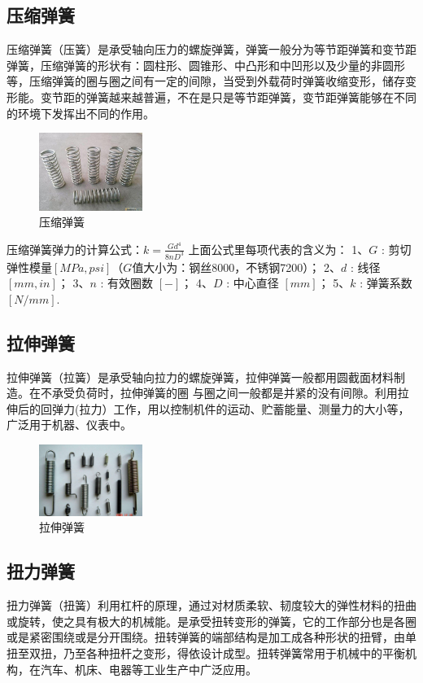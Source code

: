 \documentclass[UTF8]{article} %
\begin{document}
\subsection{压缩弹簧}
压缩弹簧（压簧）是承受轴向压力的螺旋弹簧，弹簧一般分为等节距弹簧和变节距弹簧，压缩弹簧的形状有：圆柱形、圆锥形、中凸形和中凹形以及少量的非圆形等，压缩弹簧的圈与圈之间有一定的间隙，当受到外载荷时弹簧收缩变形，储存变形能。变节距的弹簧越来越普遍，不在是只是等节距弹簧，变节距弹簧能够在不同的环境下发挥出不同的作用。

\begin{figure}[h]
  \centering
  \includegraphics[width=0.3\textwidth]{th2.png}
  \caption{压缩弹簧}
\end{figure}

压缩弹簧弹力的计算公式：$k=\frac{Gd^4}{8nD^3}$
上面公式里每项代表的含义为：
1、$G$ : 剪切弹性模量$[MPa, psi]$（$G$值大小为：钢丝8000，不锈钢7200）；
2、$d$ : 线径 $[mm, in]$；
3、$n$ : 有效圈数 $[-]$；
4、$D$ : 中心直径 $[mm]$；
5、$k$ : 弹簧系数 $[N/mm]$.



\subsection{拉伸弹簧}
拉伸弹簧（拉簧）是承受轴向拉力的螺旋弹簧，拉伸弹簧一般都用圆截面材料制造。在不承受负荷时，拉伸弹簧的圈 与圈之间一般都是并紧的没有间隙。利用拉伸后的回弹力(拉力）工作，用以控制机件的运动、贮蓄能量、测量力的大小等，广泛用于机器、仪表中。

\begin{figure}[h]
  \centering
  \includegraphics[width=0.3\textwidth]{tan3.png}
  \caption{拉伸弹簧}
\end{figure}

\subsection{扭力弹簧}
扭力弹簧（扭簧）利用杠杆的原理，通过对材质柔软、韧度较大的弹性材料的扭曲或旋转，使之具有极大的机械能。是承受扭转变形的弹簧，它的工作部分也是各圈或是紧密围绕或是分开围绕。扭转弹簧的端部结构是加工成各种形状的扭臂，由单扭至双扭，乃至各种扭杆之变形，得依设计成型。扭转弹簧常用于机械中的平衡机构，在汽车、机床、电器等工业生产中广泛应用。
\end{document}
